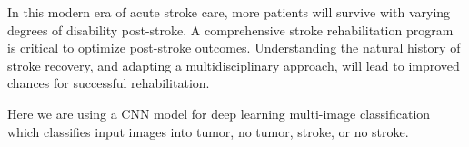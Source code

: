 In this modern era of acute stroke care, more patients will survive with varying degrees of
disability post-stroke. A comprehensive stroke rehabilitation program is critical to
optimize post-stroke outcomes. Understanding the natural history of stroke
recovery, and adapting a multidisciplinary approach, will lead to improved chances
for successful rehabilitation.

Here we are using a CNN model for deep learning multi-image classification which classifies input images into tumor, no tumor, stroke, or no stroke.



